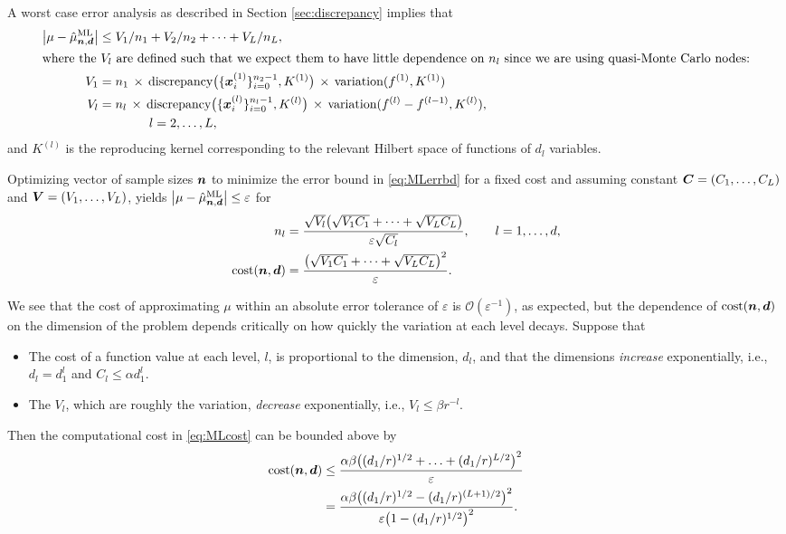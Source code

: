 \documentclass{svproc}
\begin{document}
A worst case error analysis as described in Section \ref{sec:discrepancy} implies that
\begin{align}
    \label{eq:MLerrbd}
    \bigl \lvert \mu - \hat{\mu}^{\text{ML}}_{{\boldsymbol{n}},{\boldsymbol{d}}} \bigr \rvert &\le
    V_1/n_1 + V_2/n_2 + \cdots + V_L/n_L,  \\
    \intertext{where the $V_l$ are defined such that we expect them to have little dependence on $n_l$ since we are using quasi-Monte Carlo nodes:} 
    \nonumber
    V_1 &= n_1 \, \times \, \text{discrepancy}\bigl(\{{\boldsymbol{x}}_i^{(1)}\}_{i=0}^{n_2-1}, K^{(1)} \bigr) \, \times \, \text{variation}(f^{(1)}, K^{(1)})\\
    \nonumber
    V_l & = n_l \, \times \, \text{discrepancy}\bigl(\{{\boldsymbol{x}}_i^{(l)}\}_{i=0}^{n_l-1}, K^{(l)} \bigr) \, \times \, \text{variation}(f^{(l)} - f^{(l-1)}, K^{(l)}), \\
    \nonumber
    & \qquad \qquad l = 2, \ldots, L,
\end{align}
and $K^{(l)}$ is the reproducing kernel corresponding to the relevant  Hilbert space of functions of $d_l$ variables.  

Optimizing vector of sample sizes ${\boldsymbol{n}}$ to minimize the error bound in \eqref{eq:MLerrbd} for a fixed cost and assuming constant ${\boldsymbol{C}} = (C_1, \ldots, C_L)$ and ${\boldsymbol{V}} = (V_1, \ldots, V_L)$, yields $\bigl \lvert \mu - \hat{\mu}^{\text{ML}}_{{\boldsymbol{n}},{\boldsymbol{d}}} \bigr \rvert \le \varepsilon$ for
\begin{align}
\nonumber
    n_l & = \frac{\sqrt{V_l} \bigl(\sqrt{V_1 C_1} + \cdots + \sqrt{V_LC_L}\bigr)}{\varepsilon \sqrt{C_l} }, \qquad l = 1, \ldots, d,\\
    \text{cost}({\boldsymbol{n}},{\boldsymbol{d}}) & = \frac{\bigl(\sqrt{V_1 C_1} + \cdots + \sqrt{V_LC_L}\bigr)^2}{\varepsilon}. \label{eq:MLcost}
\end{align}

We see that the cost of approximating $\mu$ within an absolute error tolerance of $\varepsilon$ is $\mathcal{O}(\varepsilon^{-1})$, as expected, but the dependence of $\text{cost}({\boldsymbol{n}},{\boldsymbol{d}})$ on the dimension of the problem depends critically on how quickly the variation at each level decays.  Suppose that 
\begin{itemize}
    \item The cost of a function value at each level, $l$, is proportional to the dimension, $d_l$, and that the dimensions \emph{increase} exponentially, i.e.,  $d_l = d_1^{l}$ and $C_l \le \alpha d_1^l$. 
    \item The $V_l$, which are roughly the variation, \emph{decrease} exponentially, i.e., $V_l \le \beta r^{-l} $.
\end{itemize}   
Then the computational cost in \eqref{eq:MLcost} can be bounded above by
\begin{align*}
     \text{cost}({\boldsymbol{n}},{\boldsymbol{d}}) & \le \frac{\alpha \beta \bigl((d_1/r)^{1/2} + \ldots + (d_1/r)^{L/2}\bigr)^2}{\varepsilon} \\
     & = \frac{\alpha \beta \bigl((d_1/r)^{1/2} - (d_1/r)^{(L+1)/2}\bigr)^2}{\varepsilon \bigl( 1 - (d_1/r)^{1/2}\bigr)^2}.
\end{align*}
\end{document}
